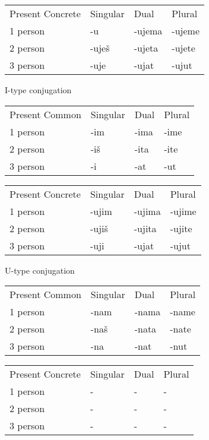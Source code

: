 \begin{table}[h]
	\begin{tabular}{llll}
		Present Concrete & Singular & Dual & Plural \\
		1 person & -u & -ujema & -ujeme \\
		2 person & -uješ & -ujeta & -ujete \\
		3 person & -uje & -ujat & -ujut
	\end{tabular}
\end{table}

I-type conjugation

\begin{table}[h]
	\begin{tabular}{llll}
		Present Common & Singular & Dual & Plural \\
		1 person & -im & -ima & -ime \\
		2 person & -iš & -ita & -ite \\
		3 person & -i & -at & -ut
	\end{tabular}
\end{table}


\begin{table}[h]
	\begin{tabular}{llll}
		Present Concrete & Singular & Dual & Plural \\
		1 person & -ujim & -ujima & -ujime \\
		2 person & -ujiš & -ujita & -ujite \\
		3 person & -uji & -ujat & -ujut
	\end{tabular}
\end{table}

U-type conjugation

\begin{table}[h]
	\begin{tabular}{llll}
		Present Common & Singular & Dual & Plural \\
		1 person & -nam & -nama & -name \\
		2 person & -naš & -nata & -nate \\
		3 person & -na & -nat & -nut
	\end{tabular}
\end{table}


\begin{table}[h]
	\begin{tabular}{llll}
		Present Concrete & Singular & Dual & Plural \\
		1 person & - & - & - \\
		2 person & - & - & - \\
		3 person & - & - & -
	\end{tabular}
\end{table}


